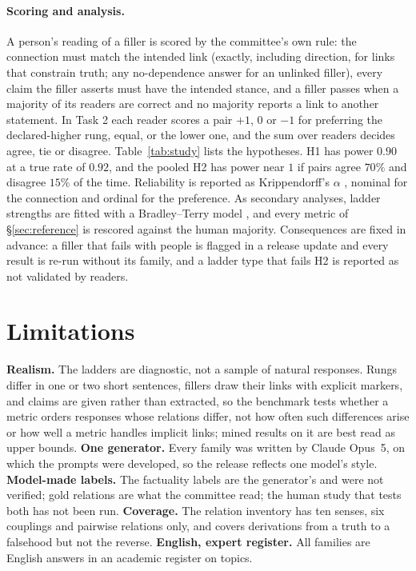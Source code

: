 \documentclass[11pt]{article}
\begin{document}
\paragraph{Scoring and analysis.} A person's reading of a filler is scored by the committee's
own rule: the connection must match the intended link (exactly, including direction, for links
that constrain truth; any no-dependence answer for an unlinked filler), every claim the filler
asserts must have the intended stance, and a filler passes when a majority of its readers are
correct and no majority reports a link to another statement. In Task 2 each reader scores a pair
$+1$, $0$ or $-1$ for preferring the declared-higher rung, equal, or the lower one, and the sum
over readers decides agree, tie or disagree. Table~\ref{tab:study} lists the hypotheses. H1
has power $0.90$ at a true rate of $0.92$, and the pooled H2 has power near $1$ if pairs agree
$70\%$ and disagree $15\%$ of the time. Reliability is reported as Krippendorff's $\alpha$
\citep{krippendorff}, nominal for the connection and ordinal for the preference. As secondary
analyses, ladder strengths are fitted with a Bradley--Terry model \citep{bradleyterry}, and every
metric of \S\ref{sec:reference} is rescored against the human majority. Consequences are fixed in
advance: a filler that fails with people is flagged in a release update and every result is
re-run without its family, and a ladder type that fails H2 is reported as not validated by
readers. 

\section{Limitations}
\label{sec:limitations}

\textbf{Realism.} The ladders are diagnostic, not a sample of natural responses. Rungs differ in
one or two short sentences, fillers draw their links with explicit markers, and claims are given
rather than extracted, so the benchmark tests whether a metric orders responses whose relations
differ, not how often such differences arise or how well a metric handles implicit links; mined
results on it are best read as upper bounds. \textbf{One generator.} Every family was written by
Claude Opus~5, on which the prompts were developed, so the release reflects one model's style. \textbf{Model-made labels.} The factuality labels are the
generator's and were not verified; gold relations are what the committee read; the human study
that tests both has not been run. \textbf{Coverage.} The relation inventory has ten senses, six
couplings and pairwise relations only, and  covers derivations from a truth to a
falsehood but not the reverse. \textbf{English, expert register.} All families are English
answers in an academic register on \lbTopics{} topics.
\end{document}
